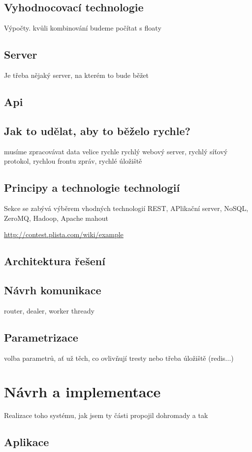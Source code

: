 \documentclass[thesis=M,czech]{FITthesis}[2014/05/07]
\begin{document}
	\section{Vyhodnocovací technologie}	
	Výpočty. kvůli kombinování budeme počítat s floaty
	\section{Server}		
	Je třeba nějaký server, na kterém to bude běžet
	\section{Api}		
	
	\section{Jak to udělat, aby to běželo rychle?}		
	musíme zpracovávat data velice rychle
	rychlý webový server, rychlý síťový protokol, rychlou frontu zpráv, rychlé úložiště

\section{Principy a technologie technologií}
Sekce se zabývá výběrem vhodných technologií
REST, APlikační server, NoSQL, ZeroMQ, Hadoop, Apache mahout

\url{http://contest.plista.com/wiki/example}
\section{Architektura řešení}
\section{Návrh komunikace}
router, dealer, worker thready
\section{Parametrizace}
volba parametrů, ať už těch, co ovlivňují tresty nebo třeba úložiště (redis...)

\chapter{Návrh a implementace}
\label{chap:impl}
Realizace toho systému, jak jsem ty části propojil dohromady a tak

\section{Aplikace}
\end{document}
